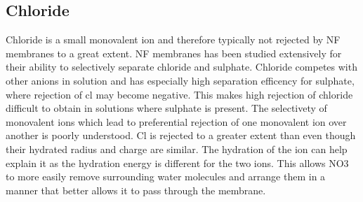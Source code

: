 \subsection{Chloride}
Chloride is a small monovalent ion and therefore typically not rejected by NF membranes to a great extent.
NF membranes has been studied extensively for their ability to selectively separate chloride and sulphate. \citep{wangSeparationPerformanceNanofiltration2005}
Chloride competes with other anions in solution and has especially high separation efficency for sulphate, where rejection of cl may become negative.
This makes high rejection of chloride difficult to obtain in solutions where sulphate is present.
The selectivety of monovalent ions which lead to preferential rejection of one monovalent ion over another is poorly understood. \citep{epszteinElucidatingMechanismsUnderlying2018}  
Cl is rejected to a greater extent than  even though their hydrated radius and charge are similar.
The hydration of the ion can help explain it as the hydration energy is different for the two ions.
This allows NO3 to more easily remove surrounding water molecules and arrange them in a manner that better allows it to pass through the membrane.  \citep{epszteinElucidatingMechanismsUnderlying2018}